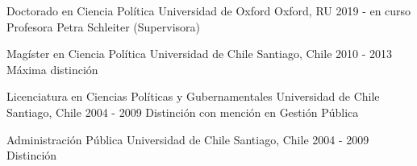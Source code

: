 





\begin{cventries}

\vspace{0.5mm}
\cventry
{Doctorado en Ciencia Política} 
{Universidad de Oxford} 
{Oxford, RU} 
{2019 - en curso} 
{Profesora Petra Schleiter (Supervisora)} \vspace{1.5mm}

\cventry
{Magíster en Ciencia Política} 
{Universidad de Chile} 
{Santiago, Chile} 
{2010 - 2013} 
{Máxima distinción} \vspace{1.5mm}

\cventry
{Licenciatura en Ciencias Políticas y Gubernamentales} 
{Universidad de Chile} 
{Santiago, Chile} 
{2004 - 2009} 
{Distinción con mención en Gestión Pública} \vspace{1.5mm}

\cventry
{Administración Pública} 
{Universidad de Chile} 
{Santiago, Chile} 
{2004 - 2009} 
{Distinción}\vspace{1.5mm}

\end{cventries}
